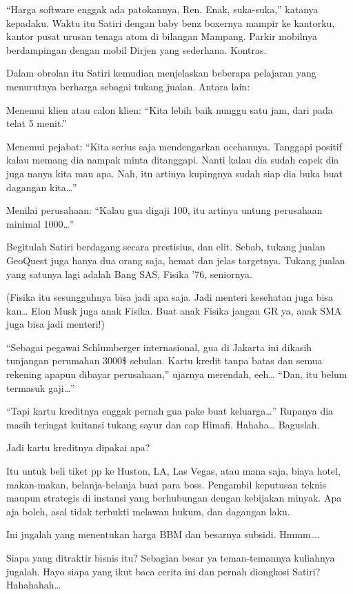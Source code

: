 “Harga software enggak ada patokannya, Ren. Enak, suka-suka,” katanya kepadaku. Waktu itu Satiri dengan baby benz boxernya mampir ke kantorku, kantor pusat urusan tenaga atom di bilangan Mampang. Parkir mobilnya berdampingan dengan mobil Dirjen yang sederhana. Kontras.

Dalam obrolan itu Satiri kemudian menjelaskan beberapa pelajaran yang menurutnya berharga sebagai tukang jualan. Antara lain:

Menemui klien atau calon klien: “Kita lebih baik nunggu satu jam, dari pada telat 5 menit.”

Menemui pejabat: “Kita serius saja mendengarkan ocehannya. Tanggapi positif kalau memang dia nampak minta ditanggapi. Nanti kalau dia sudah capek dia juga nanya kita mau apa. Nah, itu artinya kupingnya sudah siap dia buka buat dagangan kita…”

Menilai perusahaan: “Kalau gua digaji 100, itu artinya untung perusahaan minimal 1000…”

Begitulah Satiri berdagang secara prestisius, dan elit. Sebab, tukang jualan GeoQuest juga hanya dua orang saja, hemat dan jelas targetnya. Tukang jualan yang satunya lagi adalah Bang SAS, Fisika ’76, seniornya.

(Fisika itu sesungguhnya bisa jadi apa saja. Jadi menteri kesehatan juga bisa kan… Elon Musk juga anak Fisika. Buat anak Fisika jangan GR ya, anak SMA juga bisa jadi menteri!)

“Sebagai pegawai Schlumberger internasional, gua di Jakarta ini dikasih tunjangan perumahan 3000\$ sebulan. Kartu kredit tanpa batas dan semua rekening apapun dibayar perusahaan,” ujarnya merendah, eeh… “Dan, itu belum termasuk gaji…”

“Tapi kartu kreditnya enggak pernah gua pake buat keluarga…” Rupanya dia masih teringat kuitansi tukang sayur dan cap Himafi. Hahaha… Baguslah.

Jadi kartu kreditnya dipakai apa?

Itu untuk beli tiket pp ke Huston, LA, Las Vegas, atau mana saja, biaya hotel, makan-makan, belanja-belanja buat para boss. Pengambil keputusan teknis maupun strategis di instansi yang berhubungan dengan kebijakan minyak. Apa aja boleh, asal tidak terbukti melawan hukum, dan dagangan laku.

Ini jugalah yang menentukan harga BBM dan besarnya subsidi. Hmmm….

Siapa yang ditraktir bisnis itu? Sebagian besar ya teman-temannya kuliahnya jugalah. Hayo siapa yang ikut baca cerita ini dan pernah diongkosi Satiri? Hahahahah…

